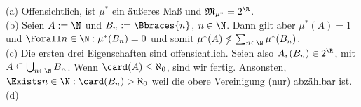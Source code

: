 \begin{solution}

(a) Offensichtlich, ist $\mu^\ast$ ein äußeres Maß und $\mathfrak{M}_{\mu^\ast} = 2^\R$. \\

(b) Seien $A := \N$ und $B_n := \Bbraces{n}$, $n \in \N$. Dann gilt aber $\mu^\ast(A) = 1$ und $\Forall n \in \N: \mu^\ast(B_n) = 0$ und somit $\mu^\ast(A) \nleq \sum_{n \in \N} \mu^\ast(B_n)$. \\

(c) Die ersten drei Eigenschaften sind offensichtlich. Seien also $A, (B_n) \in 2^\R$, mit $A \subseteq \bigcup_{n \in \N} B_n$. Wenn $\card(A) \leq \aleph_0$, sind wir fertig. Ansonsten, $\Exists n \in \N: \card(B_n) > \aleph_0$ weil die obere Vereinigung (nur) abzählbar ist. \\

(d)

\end{solution}

